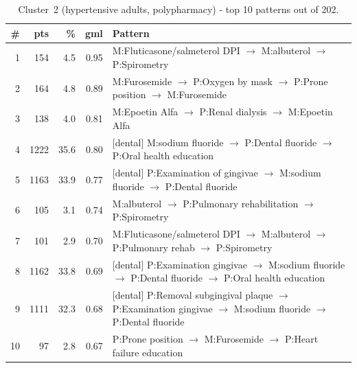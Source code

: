 \begin{table}[H]
\centering
\footnotesize
\renewcommand{\arraystretch}{1.2}
\begin{tabular}{@{}r r r r p{10.5cm}@{}}
\toprule
\textbf{\#} & \textbf{pts} & \textbf{\%} & \textbf{gml} & \textbf{Pattern} \\
\midrule
1  &  154 &  4.5 & 0.95 & M:Fluticasone/salmeterol DPI $\to$ M:albuterol $\to$ P:Spirometry \\
2  &  164 &  4.8 & 0.89 & M:Furosemide $\to$ P:Oxygen by mask $\to$ P:Prone position $\to$ M:Furosemide \\
3  &  138 &  4.0 & 0.81 & M:Epoetin Alfa $\to$ P:Renal dialysis $\to$ M:Epoetin Alfa \\
4  & 1222 & 35.6 & 0.80 & [dental] M:sodium fluoride $\to$ P:Dental fluoride $\to$ P:Oral health education \\
5  & 1163 & 33.9 & 0.77 & [dental] P:Examination of gingivae $\to$ M:sodium fluoride $\to$ P:Dental fluoride \\
6  &  105 &  3.1 & 0.74 & M:albuterol $\to$ P:Pulmonary rehabilitation $\to$ P:Spirometry \\
7  &  101 &  2.9 & 0.70 & M:Fluticasone/salmeterol DPI $\to$ M:albuterol $\to$ P:Pulmonary rehab $\to$ P:Spirometry \\
8  & 1162 & 33.8 & 0.69 & [dental] P:Examination gingivae $\to$ M:sodium fluoride $\to$ P:Dental fluoride $\to$ P:Oral health education \\
9  & 1111 & 32.3 & 0.68 & [dental] P:Removal subgingival plaque $\to$ P:Examination gingivae $\to$ M:sodium fluoride $\to$ P:Dental fluoride \\
10 &   97 &  2.8 & 0.67 & P:Prone position $\to$ M:Furosemide $\to$ P:Heart failure education \\
\bottomrule
\end{tabular}
\caption{Cluster~2 (hypertensive adults, polypharmacy) - top 10 patterns out of 202.}
\label{tab:ch6_seq_c2}
\end{table}

